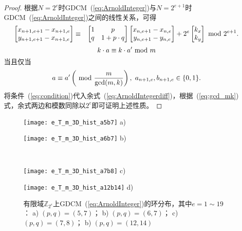 \begin{proof}
根据$N=2^e$时GDCM~(\ref{eq:ArnoldInteger})与$N=2^{e+1}$时GDCM~(\ref{eq:ArnoldInteger})之间的线性关系，可得
\begin{eqnarray}
    \begin{bmatrix}
		x_{n+1, e+1}-x_{n+1, e} \\
		y_{n+1, e+1}-x_{n+1, e}
	\end{bmatrix}
& \equiv &
	\begin{bmatrix}
		1 & p    \\
		q & 1+p\cdot q
	\end{bmatrix}
	\begin{bmatrix}
		x_{n, e+1}-x_{n, e} \\
		y_{n, e+1}-y_{n, e}
	\end{bmatrix}
+2^e
    \begin{bmatrix}
		k_x \\
		k_y
	\end{bmatrix}
\ \mathrm{mod}\ 2^{e+1}.
\label{eq:ArnoldIntegerdiff}
\end{eqnarray}
\begin{equation}
k\cdot a\equiv k\cdot a'\ \mathrm{mod}\ m
\end{equation}
当且仅当
\begin{equation}
a\equiv a'\left(\ \mathrm{mod}\ \frac{m}{\gcd(m, k)}\right),\ a_{n+1, e}, b_{n+1, e}\in \{0, 1\}.
\label{eq:gcd_mk}
\end{equation}
将条件~(\ref{eq:condition})代入余式~(\ref{eq:ArnoldIntegerdiff})，根据~(\ref{eq:gcd_mk})式，余式两边和模数同除以$2^e$即可证明上述性质。\qedsymbol
\end{proof}

\begin{figure*}[!htb]
\centering
\begin{minipage}{0.95\BigOneImW}
\centering
\texttt{[image: e\_T\_m\_3D\_hist\_a5b7]}
a)
\end{minipage} \hspace{1mm}
\begin{minipage}{0.95\BigOneImW}
\centering
\texttt{[image: e\_T\_m\_3D\_hist\_a6b7]}
b)
\end{minipage}\\
\begin{minipage}{0.95\BigOneImW}
\centering
\texttt{[image: e\_T\_m\_3D\_hist\_a7b8]}
c)
\end{minipage} \hspace{1mm}
\begin{minipage}{0.95\BigOneImW}
\centering
\texttt{[image: e\_T\_m\_3D\_hist\_a12b14]}
d)
\end{minipage}
\caption{有限域$\mathbb{Z}_{2^e}$上GDCM~(\ref{eq:ArnoldInteger})的环分布，其中$e=1\sim 19$：
a) $(p, q)=(5, 7)$； b) $(p, q)=(6, 7)$； c) $(p, q)=(7, 8)$； b) $(p, q)=(12, 14)$}
\label{fig:perioddistributionc}
\end{figure*}

